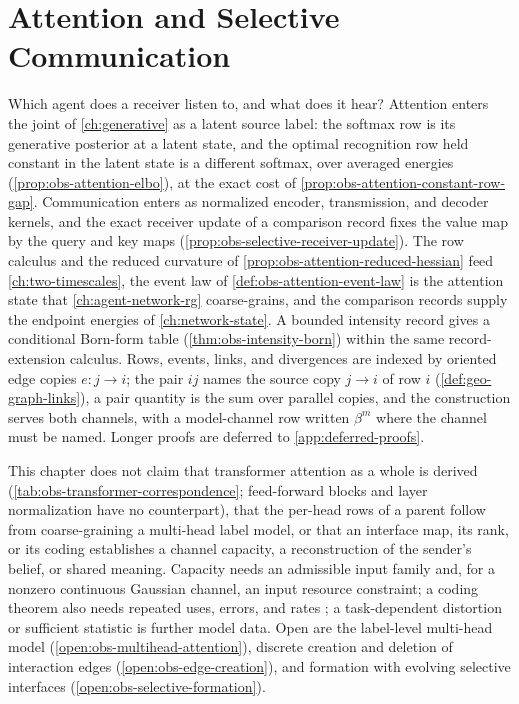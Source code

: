 \chapter{Attention and Selective Communication}
\label{ch:selective-communication}

Which agent does a receiver listen to, and what does it hear? Attention enters
the joint of \cref{ch:generative} as a latent source label: the softmax row is
its generative posterior at a latent state, and the optimal recognition row
held constant in the latent state is a different softmax, over averaged
energies (\cref{prop:obs-attention-elbo}), at the exact cost of
\cref{prop:obs-attention-constant-row-gap}. Communication enters as normalized
encoder, transmission, and decoder kernels, and the exact receiver update of a
comparison record fixes the value map by the query and key maps
(\cref{prop:obs-selective-receiver-update}). The row calculus and the reduced
curvature of \cref{prop:obs-attention-reduced-hessian} feed
\cref{ch:two-timescales}, the event law of \cref{def:obs-attention-event-law}
is the attention state that \cref{ch:agent-network-rg} coarse-grains, and the
comparison records supply the endpoint energies of \cref{ch:network-state}.
A bounded intensity record gives a conditional Born-form table
(\cref{thm:obs-intensity-born}) within the same record-extension calculus.
Rows, events, links, and divergences are indexed by oriented edge copies
\(e:j\to i\); the pair \(ij\) names the source copy \(j\to i\) of row \(i\)
(\cref{def:geo-graph-links}), a pair quantity is the sum over parallel copies, and the construction serves both channels, with a
model-channel row written \(\beta^m\) where the channel must be named.
Longer proofs are deferred to \cref{app:deferred-proofs}.

This chapter does not claim that transformer attention as a whole is derived
(\cref{tab:obs-transformer-correspondence}; feed-forward blocks and layer
normalization have no counterpart), that the per-head rows of a parent follow
from coarse-graining a multi-head label model, or that an interface map, its rank, or its coding establishes a
channel capacity, a reconstruction of the sender's belief, or shared meaning.
Capacity needs an admissible input family and, for a nonzero continuous
Gaussian channel, an input resource constraint; a coding theorem also needs
repeated uses, errors, and rates \citep{Shannon1948}; a task-dependent
distortion or sufficient statistic is further model data. Open are the
label-level multi-head model (\cref{open:obs-multihead-attention}), discrete
creation and deletion of interaction edges (\cref{open:obs-edge-creation}), and
formation with evolving selective interfaces
(\cref{open:obs-selective-formation}).


